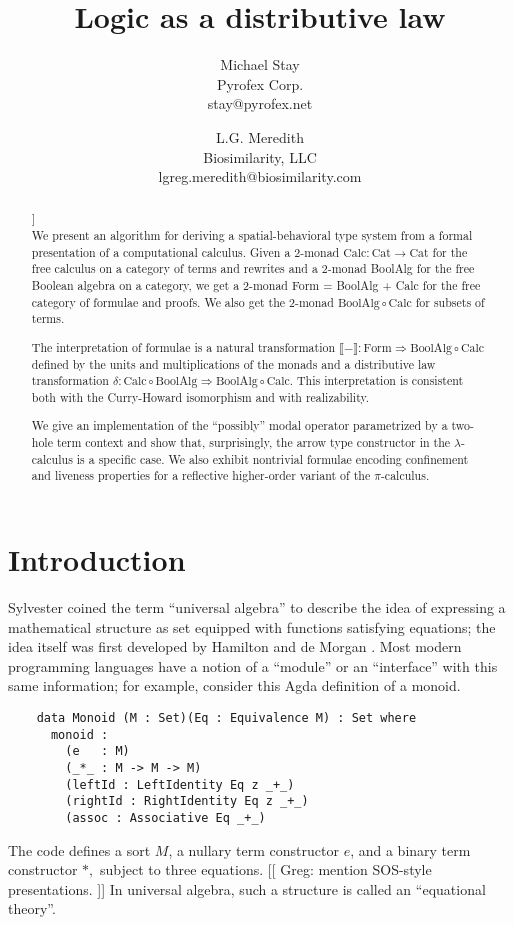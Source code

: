 \documentclass{llncs}
\title{Logic as a distributive law}
\author{
Michael Stay\\
  {Pyrofex Corp.}\\
  {\fontsize{8}{8}\selectfont stay@pyrofex.net}\\
\and
L.G. Meredith\\
  {Biosimilarity, LLC}\\
  {\fontsize{8}{8}\selectfont lgreg.meredith@biosimilarity.com}
}
\newcommand{\interp}[1]{\llbracket #1 \rrbracket}
\newcommand{\maps}{\colon}
\newcommand{\Cat}{\mathrm{Cat}}
\newcommand{\Calc}{\mathrm{Calc}}
\newcommand{\BoolAlg}{\mathrm{BoolAlg}}
\renewcommand{\Form}{\mathrm{Form}}
\begin{document}
\maketitle
\begin{abstract}
\noindent
  [[Greg: fix up author block]]\\
  We present an algorithm for deriving a spatial-behavioral type system from a formal presentation of a computational calculus.  Given a 2-monad $\Calc\maps \Cat \to \Cat$ for the free calculus on a category of terms and rewrites and a 2-monad BoolAlg for the free Boolean algebra on a category, we get a 2-monad Form = BoolAlg + Calc for the free category of formulae and proofs.  We also get the 2-monad $\BoolAlg \circ \Calc$ for subsets of terms.

  The interpretation of formulae is a natural transformation $\interp{-} \maps \Form \Rightarrow \BoolAlg \circ \Calc$ defined by the units and multiplications of the monads and a distributive law transformation $\delta\maps \Calc \circ \BoolAlg \Rightarrow \BoolAlg \circ \Calc.$  This interpretation is consistent both with the Curry-Howard isomorphism and with realizability.

  We give an implementation of the ``possibly'' modal operator parametrized by a two-hole term context and show that, surprisingly, the arrow type constructor in the $\lambda$-calculus is a specific case.  We also exhibit nontrivial formulae encoding confinement and liveness properties for a reflective higher-order variant of the $\pi$-calculus.

\end{abstract}
\section{Introduction}

  Sylvester coined the term ``universal algebra'' to describe the idea of expressing a mathematical structure as set equipped with functions satisfying equations; the idea itself was first developed by Hamilton and de Morgan \cite{Graetzer}.  Most modern programming languages have a notion of a ``module'' or an ``interface'' with this same information; for example, consider this Agda definition of a monoid.
  \begin{verbatim}
    data Monoid (M : Set)(Eq : Equivalence M) : Set where
      monoid :
        (e   : M)
        (_*_ : M -> M -> M)
        (leftId : LeftIdentity Eq z _+_)
        (rightId : RightIdentity Eq z _+_)
        (assoc : Associative Eq _+_)
  \end{verbatim}
  The code defines a sort $M$, a nullary term constructor $e$, and a binary term constructor $*,$ subject to three equations.  [[ Greg: mention SOS-style presentations. ]] In universal algebra, such a structure is called an ``equational theory''.  
\end{document}
